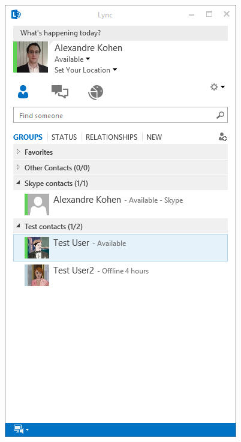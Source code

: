 \begin{figure}
	\begin{minipage}[c]{0.3\textwidth}
		\includegraphics[width=\textwidth]{Schemas/contacts.png}
	\end{minipage}
	\begin{minipage}[c]{.38\linewidth}

\end{minipage}
\end{figure}
